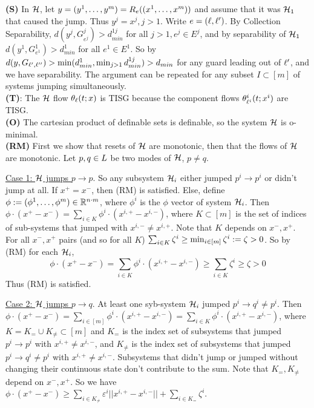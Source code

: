 \begin{prf}
\textbf{(S)} In $\mathcal{H}$, let $y=(y^1,\ldots,y^m)=R_e((x^1,\ldots,x^m))$ and assume that it was $\mathcal{H}_1$ that caused the jump.
Thus $y^j=x^j,j >1$.
Write $e=(\ell,\ell ')$.
By Collection Separability,  $d(y^j,G^j_{e^j})>d_{min}^{1j}$ for all $j>1,e^j\in E^j$, 
and by separability of $\mathcal{H}_1$ $d(y^1,G^1_{e^1}) > d_{min}^1$ for all $e^1 \in E^1$.
So by $d(y,G_{\ell', \ell ''}) > \min (d_{min}^1, \min_{j>1}d_{min}^{1j}) > d_{min}$ for any guard leading out of $\ell'$, and we have separability.
The argument can be repeated for any subset $I \subset [m]$ of systems jumping simultaneously.
\\
\textbf{(T)}:
The $\mathcal{H}$ flow $\theta_\ell(t;x)$ is TISG because the component flows $\theta^i_{\ell^i}(t;x^i)$ are TISG.
\\
\textbf{(O)} The cartesian product of definable sets is definable, so the system $\mathcal{H}$ is o-minimal.
\\
\textbf{(RM)} First we show that resets of $\mathcal{H}$ are monotonic, then that the flows of $\mathcal{H}$ are monotonic.
Let $p,q \in L$ be two modes of $\mathcal{H}$, $p\neq q$.

\underline{Case 1: $\mathcal{H}$ jumps $p \rightarrow p$}.
So any subsystem $\mathcal{H}_i$ either jumped $p^i \rightarrow p^i$ or didn't jump at all.
If $x^+ = x^-$, then (RM) is satisfied.
Else, define $\phi := (\phi^1,\ldots,\phi^m) \in \mathbb{R}^{n\cdot m}$, where $\phi^i$ is the $\phi$ vector of system $\mathcal{H}_i$.
Then $\phi \cdot (x^+ - x^-) = \sum_{i\in K}\phi^i\cdot(x^{i,+} - x^{i,-})$, 
where $K \subset [m]$ is the set of indices of sub-systems that jumped with $x^{i,-} \neq x^{i,+}$.
Note that $K$ depends on $x^-,x^+$.
%
For all $x^-,x^+$ pairs (and so for all $K$) 
$\sum_{i\in K} \zeta^i \geq \min_{i \in [m]}\zeta^i := \zeta > 0$.
So by (RM) for each $\mathcal{H}_i$,
\begin{equation*}
\label{eq:parallel rm1}
\phi \cdot (x^+ - x^-) =  \sum_{i\in K}\phi^i\cdot(x^{i,+} - x^{i,-}) \geq \sum_{i\in K}\zeta^i \geq \zeta > 0
\end{equation*}
Thus (RM) is satisfied.

\underline{Case 2: $\mathcal{H}$ jumps $p \rightarrow q$}.
At least one syb-system $\mathcal{H}_i$ jumped $p^i \rightarrow q^i \neq p^i$.
Then 
$\phi \cdot (x^+ - x^-) = \sum_{i\in [m]}\phi^i\cdot(x^{i,+} - x^{i,-}) = \sum_{i\in K}\phi^i\cdot(x^{i,+} - x^{i,-})$,
where $K = K_= \cup K_{\neq} \subset [m]$ and 
$K_=$ is the index set of subsystems that jumped $p^i \rightarrow p^i$ with $x^{i,+} \neq x^{i,-}$, 
and $K_{\neq}$ is the index set of subsystems that jumped $p^i \rightarrow q^i \neq p^i$ with $x^{i,+} \neq x^{i,-}$.
Subsystems that didn't jump or jumped without changing their continuous state don't contribute to the sum.
Note that $K_=,K_{\neq}$ depend on $x^-,x^+$.
So we have
$\phi \cdot (x^+ - x^-) \geq \sum_{i\in K_{\neq}}\varepsilon^i ||x^{i,+} - x^{i,-}|| + \sum_{i\in K_=} \zeta^i$.


\end{prf}
